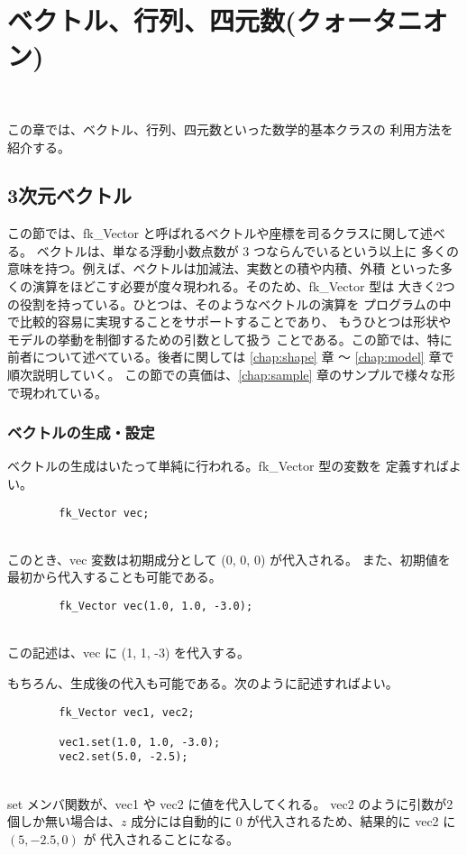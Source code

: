 \chapter{ベクトル、行列、四元数(クォータニオン)} \label{chap:vector} ~

この章では、ベクトル、行列、四元数といった数学的基本クラスの
利用方法を紹介する。

\section{3次元ベクトル}
この節では、fk\_Vector と呼ばれるベクトルや座標を司るクラスに関して述べる。
ベクトルは、単なる浮動小数点数が 3 つならんでいるという以上に
多くの意味を持つ。例えば、ベクトルは加減法、実数との積や内積、外積
といった多くの演算をほどこす必要が度々現われる。そのため、fk\_Vector 型は
大きく2つの役割を持っている。ひとつは、そのようなベクトルの演算を
プログラムの中で比較的容易に実現することをサポートすることであり、
もうひとつは形状やモデルの挙動を制御するための引数として扱う
ことである。この節では、特に前者について述べている。後者に関しては
\ref{chap:shape} 章 〜 \ref{chap:model} 章で順次説明していく。
この節での真価は、\ref{chap:sample} 章のサンプルで様々な形で現われている。

\subsection{ベクトルの生成・設定}
ベクトルの生成はいたって単純に行われる。fk\_Vector 型の変数を
定義すればよい。
\\
\begin{screen}
\begin{verbatim}
        fk_Vector vec;
\end{verbatim}
\end{screen}
~ \\
このとき、vec 変数は初期成分として (0, 0, 0) が代入される。
また、初期値を最初から代入することも可能である。
\\
\begin{screen}
\begin{verbatim}
        fk_Vector vec(1.0, 1.0, -3.0);
\end{verbatim}
\end{screen}
~ \\
この記述は、vec に (1, 1, -3) を代入する。

もちろん、生成後の代入も可能である。次のように記述すればよい。
\\
\begin{screen}
\begin{verbatim}
        fk_Vector vec1, vec2;

        vec1.set(1.0, 1.0, -3.0);
        vec2.set(5.0, -2.5);
\end{verbatim}
\end{screen}
~ \\
set メンバ関数が、vec1 や vec2 に値を代入してくれる。
vec2 のように引数が2個しか無い場合は、\(z\) 成分には自動的に
\(0\) が代入されるため、結果的に vec2 に \((5, -2.5, 0)\) が
代入されることになる。

